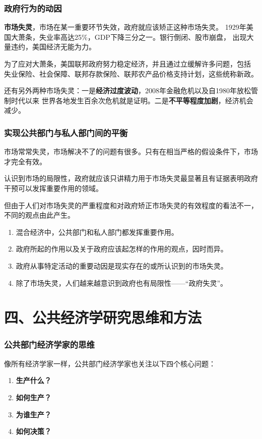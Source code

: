 \documentclass[aspectratio=169, 12pt]{beamer}
\begin{document}
\begin{frame}[plain]
    \frametitle{政府行为的动因}
    \textbf{市场失灵}，市场在某一重要环节失效，政府就应该矫正这种市场失灵。
    1929年美国大萧条，失业率高达25\%，GDP下降三分之一。银行倒闭、股市崩盘，
    出现大量违约，美国经济无能为力。\par
    为了应对大萧条，美国联邦政府努力稳定经济，并且通过立缓解许多问题，包括
    失业保险、社会保障、联邦存款保险、联邦农产品价格支持计划，这些统称新政。
    \par
    还有另外两种市场失灵：一是\textbf{经济过度波动}，2008年金融危机以及自1980年放松管制时代以来
    世界各地发生百余次危机就是证明。二是\textbf{不平等程度加剧}，经济机会减少。
\end{frame}

\begin{frame}[plain]
    \frametitle{实现公共部门与私人部门间的平衡}
    市场常常失灵，市场解决不了的问题有很多。只有在相当严格的假设条件下，市场才完全有效。
    \par
    认识到市场的局限性，政府就应该只讲精力用于市场失灵最显著且有证据表明政府
    干预可以发挥重要作用的领域。
    \par
    但由于人们对市场失灵的严重程度和对政府矫正市场失灵的有效程度的看法不一，不同的观点由此产生。
    \begin{enumerate}
        \item 混合经济中，公共部门和私人部门都发挥重要作用。
        \item 政府所起的作用以及关于政府应该起怎样的作用的观点，因时而异。
        \item 政府从事特定活动的重要动因是现实存在的或所认识到的市场失灵。
        \item 除了市场失灵，人们越来越意识到政府也有局限性——“政府失灵”。
    \end{enumerate}
\end{frame}

\section{四、公共经济学研究思维和方法}

\begin{frame}[plain]
    \frametitle{公共部门经济学家的思维}
    像所有经济学家一样，公共部门经济学家也关注以下四个核心问题：
    \begin{enumerate}
        \item \textbf{生产什么？}
        \item \textbf{如何生产？}
        \item \textbf{为谁生产？}
        \item \textbf{如何决策？}
    \end{enumerate}
\end{frame}
\end{document}
